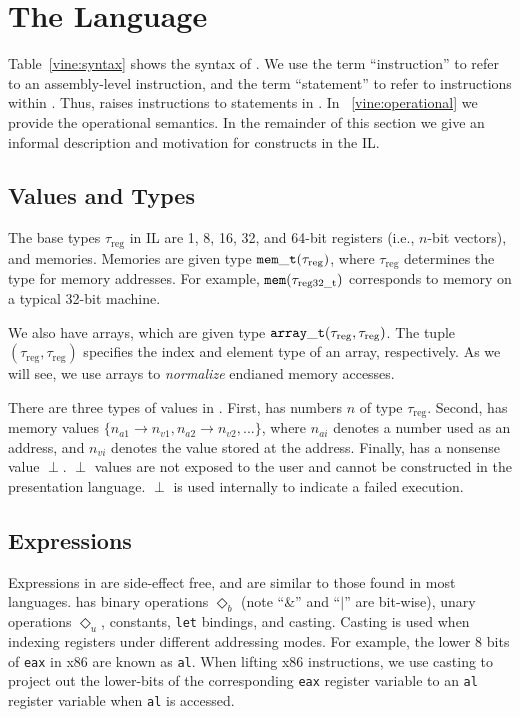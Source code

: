 \section{The \bil Language}
\label{vine:language}




Table~\ref{vine:syntax} shows the syntax of \bil. We use the term
``instruction'' to refer to an assembly-level instruction, and the
term ``statement'' to refer to instructions within \bil.  Thus, \bap
raises instructions to statements in \bil.  In %
~\ref{vine:operational} we
provide the operational semantics. In the remainder of this section we
give an informal description and motivation for constructs in the IL.


\subsection{Values and Types}
The base types $\tau_{\text{reg}}$ in \bil IL are 1, 8, 16, 32, and
64-bit registers (i.e., $n$-bit vectors), and memories. Memories are
given type ${\tt mem\_t}(\tau_{\text{reg}})$, where $\tau_{\text{reg}}$
determines the type for memory addresses. For example, ${\tt
  mem}(\tau_{\text{reg32\_t}})$ corresponds to memory on a typical
32-bit machine.  

We also have arrays, which are given type ${\tt
  array\_t}(\tau_{\text{reg}},\tau_{\text{reg}})$. The tuple
$(\tau_{\text{reg}},\tau_{\text{reg}})$ specifies the index and
element type of an array, respectively.  As we will see, we use arrays
to \emph{normalize} endianed memory accesses.

There are three types of values in \bil. First, \bil has numbers $n$
of type $\tau_{\text{reg}}$. Second, \bil has memory values $\{
n_{a1} \rightarrow n_{v1}, n_{a2} \rightarrow n_{v2}, ... \}$, where
$n_{ai}$ denotes a number used as an address, and $n_{vi}$ denotes the
value stored at the address.  Finally, \bil has a nonsense value
$\perp$. $\perp$ values are not exposed to the user and cannot be
constructed in the presentation language.  $\perp$ is used internally
to indicate a failed execution.


\subsection{Expressions}
Expressions in \bil are side-effect free, and are similar to those
found in most languages.  \bil has binary operations $\Diamond_b$
(note ``\&'' and ``$|$'' are bit-wise), unary operations $\Diamond_u$,
constants, {\tt let} bindings, and casting.  Casting is used when
indexing registers under different addressing modes. For example, the
lower 8 bits of {\tt eax} in x86 are known as {\tt al}.  When lifting
x86 instructions, we use casting to project out the lower-bits of the
corresponding {\tt eax} register variable to an {\tt al} register
variable when {\tt al} is accessed.

